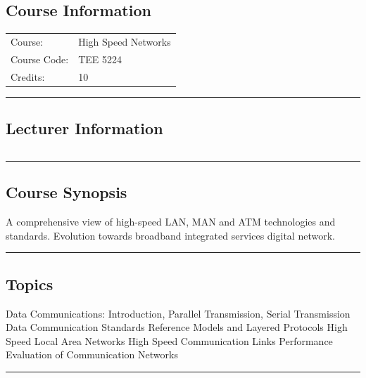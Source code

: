 
\subsection*{Course Information}\label{course:5224}
\vspace{0ex}%
\noindent\parbox{0.5\textwidth}{%
    \noindent\begin{tabular}{@{}ll}
                 \textsf{Course:}          & 	High Speed Networks  \\
                 \textsf{Course Code:}         & 	TEE  5224   \\
                 \textsf{Credits:}    & 	10
    \end{tabular}}
\vspace{2ex}\hrule\vspace{2ex}

\subsection*{Lecturer Information}
\noindent\parbox{0.5\textwidth}{%
    \noindent\begin{tabular}{@{}ll}
                 
    \end{tabular}}
\vspace{2ex}\hrule\vspace{2ex}

\subsection*{Course Synopsis}
A comprehensive view of high-speed LAN, MAN and ATM technologies and standards.
Evolution towards broadband integrated services digital network.
\vspace{2ex} \hrule\vspace{2ex}

\subsection*{Topics}
\begin{outline}
    \1 Data Communications: Introduction, Parallel Transmission, Serial Transmission
    \1 Data Communication Standards
    \1 Reference Models and Layered Protocols
    \1 High Speed Local Area Networks
    \1 High Speed Communication Links
    \1 Performance Evaluation of Communication Networks
\end{outline}
\vspace{2ex} \hrule\vspace{2ex}

